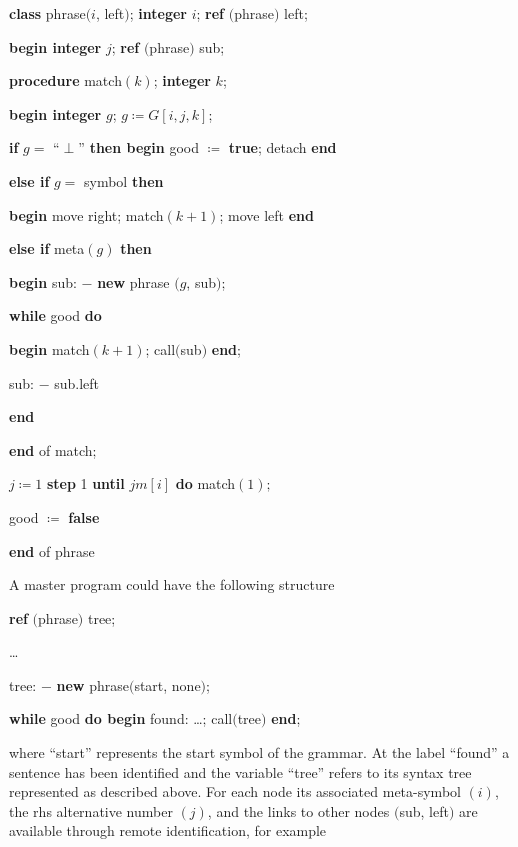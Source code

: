 \documentclass[twoside,11pt]{book}
\begin{document}
\quad \textbf{class} phrase$(i$, left$)$; \textbf{integer} $i$; \textbf{ref} $($phrase$)$ left;

\quad \textbf{begin integer} $j$; \textbf{ref} $($phrase$)$ sub;

\quad \quad \textbf{procedure} match$(k)$; \textbf{integer} $k$;

\quad \quad \textbf{begin integer} $g$; $g\coloneq G[i,j, k]$;

\quad \quad \quad \textbf{if} $g =$ ``$\perp$'' \textbf{then begin} good $\coloneq$ \textbf{true}; detach \textbf{end}

\quad \quad \quad \textbf{else if} $g =$ symbol \textbf{then}

\quad \quad \quad \textbf{begin} move right; match$(k + 1)$; move left \textbf{end}

\quad \quad \quad \textbf{else if} meta$(g)$ \textbf{then}

\quad \quad \quad \textbf{begin} sub: $-$ \textbf{new} phrase $(g$, sub$)$;

\quad \quad \quad \quad \textbf{while} good \textbf{do}

\quad \quad \quad \quad \textbf{begin} match$(k + 1)$; call$($sub$)$ \textbf{end};

\quad \quad \quad \quad \quad sub: $-$ sub.left

\quad \quad \quad \quad \textbf{end}

\quad \quad \textbf{end} of match;

\quad \quad $j\coloneq 1$ \textbf{step} 1 \textbf{until} $jm[i]$ \textbf{do} match$(1);$

\quad \quad good $\coloneq$ \textbf{false}

\quad \textbf{end} of phrase

\noindent
A master program could have the following structure

\quad \textbf{ref} $($phrase$)$ tree;

\quad \dots

\quad tree: $-$ \textbf{new} phrase$($start, none$)$;

\quad \textbf{while} good \textbf{do begin} found: \dots; call$($tree$)$ \textbf{end};

\noindent
where ``start'' represents the start symbol of the grammar. At the label ``found'' a sentence has been identified and the variable ``tree'' refers to its syntax tree represented as described above. For each node its associated meta-symbol $(i)$, the rhs alternative number $(j)$, and the links to other nodes $($sub, left$)$ are available through remote identification, for example
\end{document}
